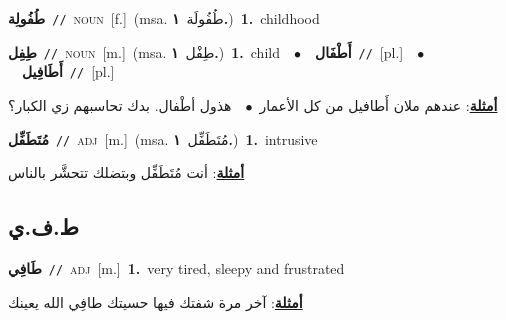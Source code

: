 \documentclass[10pt,a4paper,twoside]{article} %
\begin{document}
\begin{multicols}{2}
{\setlength\topsep{0pt}\textbf{\foreignlanguage{arabic}{طُفُولِة}}\ {\color{gray}\texttt{//}\color{black}}\ \textsc{noun}\ [f.]\ \color{gray}(msa. \foreignlanguage{arabic}{طُفُولَة}~\foreignlanguage{arabic}{\textbf{١.}})\color{black}\ \textbf{1.}~childhood\ } \vspace{2mm}

{\setlength\topsep{0pt}\textbf{\foreignlanguage{arabic}{طِفِل}}\ {\color{gray}\texttt{//}\color{black}}\ \textsc{noun}\ [m.]\ \color{gray}(msa. \foreignlanguage{arabic}{طِفْل}~\foreignlanguage{arabic}{\textbf{١.}})\color{black}\ \textbf{1.}~child\ \ $\bullet$\ \ \setlength\topsep{0pt}\textbf{\foreignlanguage{arabic}{أَطْفَال}}\ {\color{gray}\texttt{//}\color{black}}\ [pl.]\ \ $\bullet$\ \ \setlength\topsep{0pt}\textbf{\foreignlanguage{arabic}{أَطَافِيل}}\ {\color{gray}\texttt{//}\color{black}}\ [pl.]\  \begin{flushright}\color{gray}\foreignlanguage{arabic}{\textbf{\underline{\foreignlanguage{arabic}{أمثلة}}}: عندهم ملان أَطافيل من كل الأعمار\ $\bullet$\ \  هذول أطْفال. بدك تحاسبهم زي الكبار؟}\end{flushright}\color{black}} \vspace{2mm}

{\setlength\topsep{0pt}\textbf{\foreignlanguage{arabic}{مُتَطَفِّل}}\ {\color{gray}\texttt{//}\color{black}}\ \textsc{adj}\ [m.]\ \color{gray}(msa. \foreignlanguage{arabic}{مُتَطَفِّل}~\foreignlanguage{arabic}{\textbf{١.}})\color{black}\ \textbf{1.}~intrusive\  \begin{flushright}\color{gray}\foreignlanguage{arabic}{\textbf{\underline{\foreignlanguage{arabic}{أمثلة}}}: أنت مُتَطَفِّل وبتضلك تتحشَّر بالناس}\end{flushright}\color{black}} \vspace{2mm}

\vspace{-3mm}
\subsection*{\color{blue}\foreignlanguage{arabic}{ط.ف.ي}\color{blue}{}} 

{\setlength\topsep{0pt}\textbf{\foreignlanguage{arabic}{طَافِي}}\ {\color{gray}\texttt{//}\color{black}}\ \textsc{adj}\ [m.]\ \textbf{1.}~very tired, sleepy and frustrated\  \begin{flushright}\color{gray}\foreignlanguage{arabic}{\textbf{\underline{\foreignlanguage{arabic}{أمثلة}}}: آخر مرة شفتك فيها حسيتك طافِي الله يعينك}\end{flushright}\color{black}} \vspace{2mm}


\end{multicols}
\end{document}
